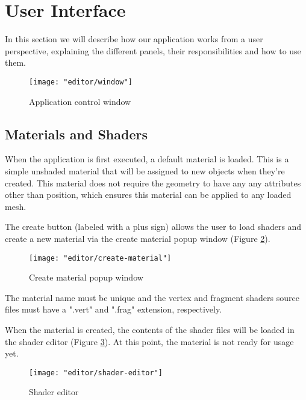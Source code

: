 \section{User Interface}
In this section we will describe how our application works from a user perspective, explaining the different panels, their responsibilities and how to use them.

\begin{figure}[ht]
    \caption{Application control window}
    \begin{center}
        \texttt{[image: "editor/window"]}
    \end{center}
    \label{fig:window}
\end{figure}


\subsection{Materials and Shaders}
When the application is first executed, a default material is loaded. This is a simple unshaded material that will be assigned to new objects when they're created. This material does not require the geometry to have any any attributes other than position, which ensures this material can be applied to any loaded mesh.

The create button (labeled with a plus sign) allows the user to load shaders and create a new material via the create material popup window (Figure \ref{fig:create-material}).

\begin{figure}[h]
    \caption{Create material popup window}
    \begin{center}
        \texttt{[image: "editor/create-material"]}
    \end{center}
    \label{fig:create-material}
\end{figure}

The material name must be unique and the vertex and fragment shaders source files must have a ".vert" and ".frag" extension, respectively.

When the material is created, the contents of the shader files will be loaded in the shader editor (Figure \ref{fig:shader-editor}). At this point, the material is not ready for usage yet.

\begin{figure}
    \caption{Shader editor}
    \begin{center}
        \texttt{[image: "editor/shader-editor"]}
    \end{center}
    \label{fig:shader-editor}
\end{figure}

